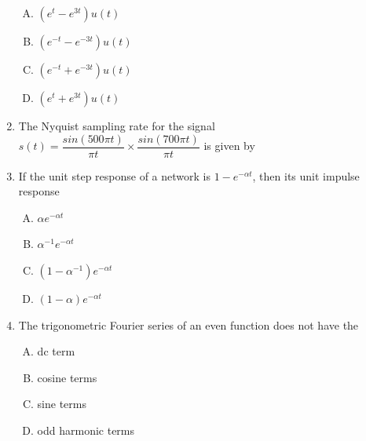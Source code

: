 \documentclass[journal,12pt,twocolumn]{IEEEtran}
\begin{document}
\begin{enumerate}[1.]
\begin{enumerate}[(A)]

\setlength\itemsep{1em}

\item $(e^{t}-e^{3t})u(t)$
\item $(e^{-t}-e^{-3t})u(t)$
\item $(e^{-t}+e^{-3t})u(t)$
\item $(e^{t}+e^{3t})u(t)$

\end{enumerate}


\item The Nyquist sampling rate for the signal $s(t)=\dfrac{sin(500\pi t)}{\pi t}\times \dfrac{sin(700\pi t)}{\pi t}$ is given by 

\begin{enumerate}[(A)]
\end{enumerate}

\item If the unit step response of a network is $1-e^{-\alpha t}$, then its unit impulse response

\begin{enumerate}[(A)]
\setlength\itemsep{1em}

\item $\alpha e^{-\alpha t}$
\item $\alpha^{-1} e^{-\alpha t}$
\item $(1-\alpha^{-1}) e^{-\alpha t}$
\item $(1-\alpha) e^{-\alpha t}$
\end{enumerate}

\item The trigonometric Fourier series of an even function does not have the
\begin{enumerate}[(A)]
\setlength\itemsep{1em}

\item dc term
\item cosine terms
\item sine terms
\item odd harmonic terms
\end{enumerate}


\end{enumerate}
\end{document}
